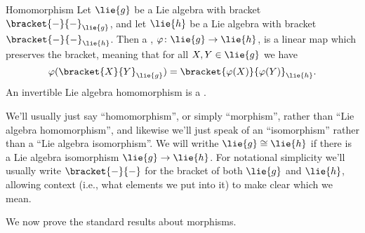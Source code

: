 \documentclass[fleqn]{NotesClass}
\newcommand{\isomorphic}{\cong}
\begin{document}
    \begin{dfn}{Homomorphism}{}
        Let \(\lie{g}\) be a Lie algebra with bracket \(\bracket{-}{-}_{\lie{g}}\), and let \(\lie{h}\) be a Lie algebra with bracket \(\bracket{-}{-}_{\lie{h}}\).
        Then a , \(\varphi \colon \lie{g} \to \lie{h}\), is a linear map which preserves the bracket, meaning that for all \(X, Y \in \lie{g}\) we have
        \begin{equation}
            \varphi(\bracket{X}{Y}_{\lie{g}}) = \bracket{\varphi(X)}{\varphi(Y)}_{\lie{h}}.
        \end{equation}
        An invertible Lie algebra homomorphism is a .
    \end{dfn}
    
    We'll usually just say \enquote{homomorphism}, or simply \enquote{morphism}, rather than \enquote{Lie algebra homomorphism}, and likewise we'll just speak of an \enquote{isomorphism} rather than a \enquote{Lie algebra isomorphism}.
    We will writhe \(\lie{g} \isomorphic \lie{h}\) if there is a Lie algebra isomorphism \(\lie{g} \to \lie{h}\).
    For notational simplicity we'll usually write \(\bracket{-}{-}\) for the bracket of both \(\lie{g}\) and \(\lie{h}\), allowing context (i.e., what elements we put into it) to make clear which we mean.
    
    We now prove the standard results about morphisms.
    
\end{document}
